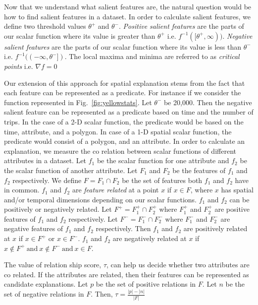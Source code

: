 Now that we understand what salient features are, the natural question would be how to find salient features in a dataset. In order to calculate salient features, we define two threshold values $\theta^+$ and $\theta^-$. \textit{Positive salient features} are the parts of our scalar function where its value is greater than $\theta^+$ i.e. $f^{-1}([\theta^+, \infty))$. \textit{Negative salient features} are the parts of our scalar function where its value is less than $\theta^-$ i.e. $f^{-1}((-\infty, \theta^-])$. The local maxima and minima are referred to as \textit{critical points} i.e. $\nabla f = 0$

Our extension of this approach for spatial explanation stems from the fact that each feature can be represented as a predicate. For instance if we consider the function represented in Fig.~\ref{fig:yellowstats}. Let $\theta^-$ be 20,000. Then the negative salient feature can be represented as a predicate based on time and the number of trips. In the case of a 2-D scalar function, the predicate would be based on the time, attribute, and a polygon. In case of a 1-D spatial scalar function, the predicate would consist of a polygon, and an attribute. In order to calculate an explanation, we measure the co relation between scalar functions of different attributes in a dataset. Let $f_1$ be the scalar function for one attribute and $f_2$ be the scalar function of another attribute. Let $F_1$ and $F_2$ be the features of $f_1$ and $f_2$ respectively. We define $F = F_1 \cap F_2$ be the set of features both $f_1$ and $f_2$ have in common. $f_1$ and $f_2$ are \textit{feature related} at a point $x$ if $x \in F$, where $x$ has spatial and/or temporal dimensions depending on our scalar functions. $f_1$ and $f_2$ can be positively or negatively related. Let $F^+ = F_1^+ \cap F_2^+$ where $F_1^+$ and $F_2^+$ are positive features of $f_1$ and $f_2$ respectively. Let $F^- = F_1^- \cap F_2^-$ where $F_1^-$ and $F_2^-$ are negative features of $f_1$ and $f_2$ respectively. Then $f_1$ and $f_2$ are positively related at $x$ if $x \in F^+$  or $x \in F^-$. $f_1$ and $f_2$ are negatively related at $x$ if $x \notin F^+\ \text{and}\ x \notin F^-\ \text{and}\ x\in F$. 

The value of relation ship score, $\tau$, can help us decide whether two attributes are co related. If the attributes are related, then their features can be represented as candidate explanations. Let $p$ be the set of positive relations in $F$. Let $n$ be the set of negative relations in $F$. Then,
$\tau = \frac{|p|-|n|}{|F|}$


